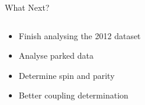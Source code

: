 \documentclass{beamer}
\begin{document}
\begin{frame}{What Next?}
  \begin{columns}
    \begin{column}{.5\textwidth}
      \begin{itemize}
      \item Finish analysing the 2012 dataset
      \item Analyse parked data
      \item Determine spin and parity
      \item Better coupling determination
        \end{itemize}
    \end{column}
    \begin{column}{.5\textwidth}
    \end{column}
  \end{columns}
\end{frame}
\end{document}
